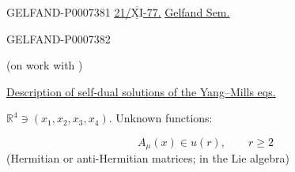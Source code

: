 \begin{GelfandAdjacentEvidence}{GELFAND-P000738}{1}
\noindent\underline{\underline{21/\(\overline{\underline{\mathrm{XI}}}\)-77.}}\qquad
\underline{\underline{Gelfand Sem.}}

\end{GelfandAdjacentEvidence}
\begin{GelfandAdjacentEvidence}{GELFAND-P000738}{2}


(on work with )

\underline{Description of self-dual solutions of the Yang–Mills eqs.}

\(\mathbb R^4\ni(x_1,x_2,x_3,x_4)\). \qquad Unknown functions:

\[
A_\mu(x)\in u(r),\qquad r\geq 2
\]
(Hermitian or anti-Hermitian matrices; in the Lie algebra)
\end{GelfandAdjacentEvidence}
